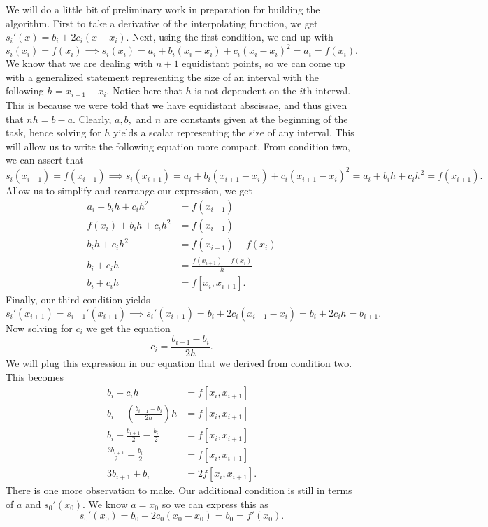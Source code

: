 \documentclass{article}
\begin{document}
\begin{enumerate}[label = {\arabic*}]
\begin{enumerate}
			\hspace{15pt} We will do a little bit of preliminary work in preparation for building the algorithm. First to take a derivative of the interpolating function, we get $s_i'(x) = b_i + 2c_i(x - x_i).$ Next, using the first condition, we end up with \[ s_i(x_i) = f(x_i) \implies s_i(x_i) = a_i + b_i(x_i - x_i) + c_i(x_i - x_i)^2 = a_i = f(x_i).\] We know that we are dealing with $n + 1$ equidistant points, so we can come up with a generalized statement representing the size of an interval with the following $h = x_{i + 1} - x_i$. Notice here that $h$ is not dependent on the $i$th interval. This is because we were told that we have equidistant abscissae, and thus given that $nh = b - a$. Clearly, $a, b,$ and $n$ are constants given at the beginning of the task, hence solving for $h$ yields a scalar representing the size of any interval. This will allow us to write the following equation more compact. From condition two, we can assert that \[s_i(x_{i + 1}) = f(x_{i + 1}) \implies s_i(x_{i+1}) = a_i + b_i(x_{i+1} - x_i) + c_i(x_{i+1} - x_i)^2 = a_i + b_ih + c_ih^2 = f(x_{i + 1}).\] Allow us to simplify and rearrange our expression, we get
			\begin{align*}
				a_i + b_ih + c_ih^2 &= f(x_{i + 1}) \\
				f(x_i) + b_ih + c_ih^2 &= f(x_{i + 1}) \\
				b_ih + c_ih^2 &= f(x_{i + 1}) - f(x_i) \\
				b_i + c_ih &= \frac{f(x_{i + 1}) - f(x_i)}{h} \\
				b_i + c_ih &= f[x_i, x_{i + 1}]. 
			\end{align*}
			Finally, our third condition yields \[s_i ' (x_{i + 1}) = s_{i + 1}'(x_{i + 1}) \implies s_i ' (x_{i + 1}) = b_i + 2c_i(x_{i + 1} - x_i) = b_i + 2c_ih = b_{i + 1}.\] Now solving for $c_i$ we get the equation \[c_i = \frac{b_{i + 1} - b_i}{2h}.\] We will plug this expression in our equation that we derived from condition two. This becomes 
			\begin{align*}
				b_i + c_ih &= f[x_i, x_{i + 1}] \\
				b_i + \left( \frac{b_{i + 1} - b_i}{2h} \right)h &= f[x_i, x_{i + 1}] \\
				b_i + \frac{b_{i + 1}}{2} - \frac{b_i}{2} &= f[x_i, x_{i + 1}] \\
				\frac{3b_{i + 1}}{2} + \frac{b_i}{2} &= f[x_i, x_{i + 1}] \\
				3b_{i + 1} + b_i &= 2f[x_i, x_{i + 1}].
			\end{align*} 
			\hspace{15pt} There is one more observation to make. Our additional condition is still in terms of $a$ and $s_0'(x_0)$. We know $a = x_0$ so we can express this as \[s_0'(x_0) = b_0 + 2c_0(x_0 - x_0) = b_0 = f'(x_0).\]
			

\end{enumerate}
\end{enumerate}
\end{document}

